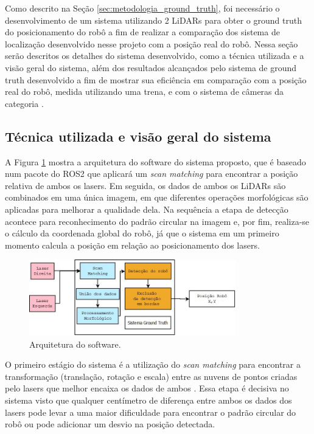 \documentclass[acronym, symbols, table]{fei}
\begin{document}
			Como descrito na Seção \ref{sec:metodologia_ground_truth}, foi necessário o desenvolvimento de um sistema utilizando 2 LiDARs para obter o ground truth do posicionamento do robô a fim de realizar a comparação dos sistema de localização desenvolvido nesse projeto com a posição real do robô. Nessa seção serão descritos os detalhes do sistema desenvolvido, como a técnica utilizada e a visão geral do sistema, além dos resultados alcançados pelo sistema de ground truth desenvolvido a fim de mostrar sua eficiência em comparação com a posição real do robô, medida utilizando uma trena, e com o sistema de câmeras da categoria .
		
			\subsection{Técnica utilizada e visão geral do sistema}
				
				A Figura \ref{fig:software_architecture} mostra a arquitetura do software do sistema proposto, que é baseado num pacote do ROS2 que aplicará um \textit{scan matching} para encontrar a posição relativa de ambos os lasers. Em seguida, os dados de ambos os LiDARs são combinados em uma única imagem, em que diferentes operações morfológicas são aplicadas para melhorar a qualidade dela. Na sequência a etapa de detecção acontece para reconhecimento do padrão circular na imagem e, por fim, realiza-se o cálculo da coordenada global do robô, já que o sistema em um primeiro momento calcula a posição em relação ao posicionamento dos lasers.
					
				\begin{figure}[!htb]
					\centering
					\includegraphics[width=0.80\textwidth]{software_architecture.jpeg}
					\caption{Arquitetura do software.} \label{fig:software_architecture}
				\end{figure}
			
				O primeiro estágio do sistema é a utilização do \textit{scan matching} para encontrar a transformação (translação, rotação e escala) entre as nuvens de pontos criadas pelo lasers que melhor encaixa os dados de ambos \cite{NIETO200739}. Essa etapa é decisiva no sistema visto que qualquer centímetro de diferença entre ambos os dados dos lasers pode levar a uma maior dificuldade para encontrar o padrão circular do robô ou pode adicionar um desvio na posição detectada.
								
\end{document}
